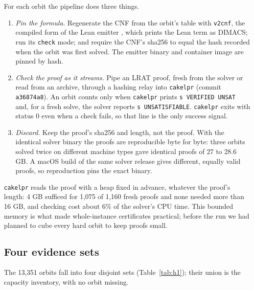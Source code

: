 \documentclass{anvil-paper}
\newcommand{\repobase}{https://github.com/rjwalters/lean-genius/blob/erdos85/integration}
\newcommand{\repofile}[2]{\href{\repobase/#1}{\lean{#2}}}
\newcommand{\cakelpr}{\texttt{cake\textunderscore lpr}}
\newcommand{\vtwocnf}{\texttt{v2cnf}}
\theoremstyle{definition}
\begin{document}
For each orbit the pipeline does three things.
\begin{enumerate}
\item \emph{Pin the formula.} Regenerate the CNF from the orbit's table with \vtwocnf, the compiled form of the Lean emitter \repofile{proofs/Proofs/Erdos85OneHighV2CnfEmit.lean}{Erdos85OneHighV2CnfEmit.lean}, which prints the Lean term  as DIMACS; run its \texttt{check} mode; and require the CNF's sha256 to equal the hash recorded when the orbit was first solved. The emitter binary and container image are pinned by hash.
\item \emph{Check the proof as it streams.} Pipe an LRAT proof, fresh from the solver or read from an archive, through a hashing relay into \cakelpr{} (commit \texttt{a36874a8}). An orbit counts only when \cakelpr{} prints \texttt{s VERIFIED UNSAT} and, for a fresh solve, the solver reports \texttt{s UNSATISFIABLE}. \cakelpr{} exits with status 0 even when a check fails, so that line is the only success signal.
\item \emph{Discard.} Keep the proof's sha256 and length, not the proof. With the identical solver binary the proofs are reproducible byte for byte: three orbits solved twice on different machine types gave identical proofs of 27 to 28.6 GB. A macOS build of the same solver release gives different, equally valid proofs, so reproduction pins the exact binary.
\end{enumerate}
\cakelpr{} reads the proof with a heap fixed in advance, whatever the proof's length: 4 GB sufficed for 1,075 of 1,160 fresh proofs and none needed more than 16 GB, and checking cost about 6\% of the solver's CPU time. This bounded memory is what made whole-instance certificates practical; before the run we had planned to cube every hard orbit to keep proofs small.

\subsection{Four evidence sets}\label{sec:sets}

The 13,351 orbits fall into four disjoint sets (Table~\ref{tab:h1}); their union is the capacity inventory, with no orbit missing.
\end{document}
